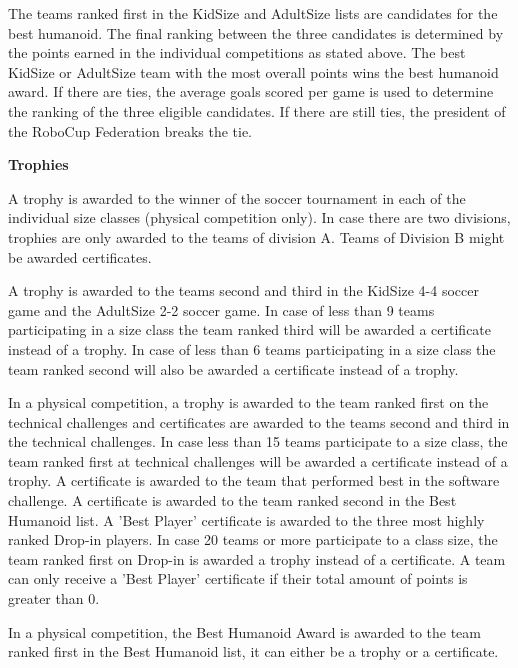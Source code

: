 The teams ranked first in the KidSize and AdultSize lists
are candidates for the best humanoid.
The final ranking between the three candidates is determined by the points
earned in the individual competitions as stated above.
The best KidSize or AdultSize team with the most overall
points wins the best humanoid award.
If there are ties, the average goals scored per game is used to determine the
ranking of the three eligible candidates.
If there are still ties, the president of the RoboCup Federation breaks the tie.

\bigskip

{\bfseries Trophies}

\headlinebox

A trophy is awarded to the winner of the soccer tournament in each of the
individual size classes
(physical competition only).
In case there are two divisions, trophies are only awarded to the teams
of division A. Teams of Division B might be awarded certificates.


\bigskip

A trophy is awarded to the teams second and third in the KidSize 4-4 soccer game
and the AdultSize 2-2 soccer game.
In case of less than 9 teams participating in a size class the team ranked third
will be awarded a certificate instead of a trophy.
In case of less than 6 teams participating in a size class the team ranked
second will also be awarded a certificate instead of a trophy.

\bigskip

In a physical competition, a trophy is awarded to the team ranked first
on the technical challenges and certificates are awarded to the teams second
and third in the technical challenges.
In case less than 15 teams participate to a size class, the team ranked
first at technical challenges will be awarded a certificate instead of a trophy.
A certificate is awarded to the team that performed best in the software challenge.
A certificate is awarded to the team ranked second in the Best Humanoid list.
A 'Best Player' certificate is awarded to the three most highly ranked
Drop-in players.
In case 20 teams or more participate to a class size, the team ranked first on
Drop-in is awarded a trophy instead of a certificate.
A team can only receive a 'Best Player' certificate if their total amount of
points is greater than 0.

\bigskip

In a physical competition, the Best Humanoid Award is awarded to the team ranked first in the Best Humanoid list,
it can either be a trophy or a certificate.


